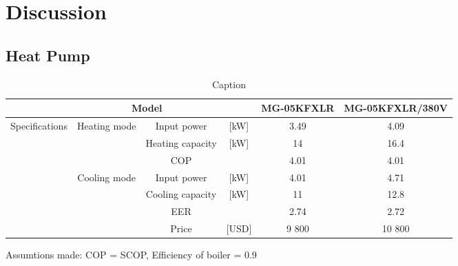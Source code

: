 \chapter{Discussion}

\section{Heat Pump}

\begin{table}[h!]
    \centering
        \caption{Caption}
    \begin{tabular}{|p{2cm}|c|c|c|c|c|}
         \hline
         & \multicolumn{2}{c}{Model} & & MG-05KFXLR & MG-05KFXLR/380V \\
         \hline
        \multirow{6}{*}{Specifications} & \multirow{3}{*}{Heating mode} & Input power & [kW] & 3.49  & 4.09 \\
         \cline{3-6}
        & &Heating capacity& [kW] & 14 & 16.4 \\
        \cline{3-6} 
        & &COP & &4.01 & 4.01 \\
        \cline{2-6}
        & \multirow{3}{*}{Cooling mode} &Input power &[kW]  & 4.01 & 4.71\\
         \cline{3-6}
        & &Cooling capacity &[kW] & 11 & 12.8\\
        \cline{3-6}
        & &EER & & 2.74 & 2.72 \\
        \hline
        & & Price & [USD] & 9 800 & 10 800 \\
        \hline
    \end{tabular}
    \label{tab:hpchina}
    \end{table}
    
Assumtions made: COP = SCOP, Efficiency of boiler = 0.9
    
